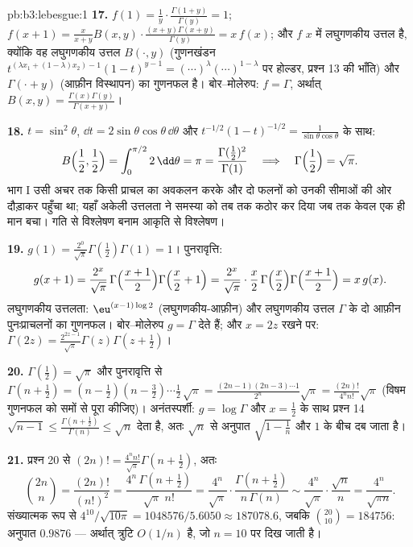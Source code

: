 \begin{solution}{pb:b3:lebesgue:1}
\textbf{17.} $f(1) = \frac1y\cdot\frac{\Gamma(1+y)}{\Gamma(y)}
= 1$; $f(x+1) = \frac{x}{x+y}B(x,y)\cdot\frac{(x+y)\Gamma(x+y)}
{\Gamma(y)} = x\,f(x)$; और $f$ $x$ में लघुगणकीय उत्तल है,
क्योंकि वह लघुगणकीय उत्तल $B(\cdot, y)$ (गुणनखंडन $t^{(\lambda x_1 + (1-\lambda)x_2)-1}(1-t)^{y-1}
= (\cdots)^\lambda(\cdots)^{1-\lambda}$ पर होल्डर, प्रश्न
13 की भाँति) और $\Gamma(\cdot + y)$ (आफ़ीन विस्थापन) का गुणनफल है। बोर--मोलेरुप:
$f =
\Gamma$, अर्थात् $B(x, y) =
\frac{\Gamma(x)\Gamma(y)}{\Gamma(x+y)}$।

\textbf{18.} $t = \sin^2\theta$, $\dd t =
2\sin\theta\cos\theta\,\dd\theta$ और $t^{-1/2}(1-t)^{-1/2} =
\frac1{\sin\theta\cos\theta}$ के साथ:
\[
B\Bigl(\frac12, \frac12\Bigr) =
\int_0^{\pi/2}2\,\dd\theta = \pi
= \frac{\Gamma(\frac12)^2}{\Gamma(1)}
\quad\Longrightarrow\quad
\Gamma\Bigl(\frac12\Bigr) = \sqrt\pi .
\]
भाग I उसी अचर तक किसी प्राचल का अवकलन करके और दो फलनों को उनकी
सीमाओं की ओर दौड़ाकर पहुँचा था; यहाँ अकेली उत्तलता ने समस्या को तब
तक कठोर कर दिया जब तक केवल एक ही मान बचा। गति से विश्लेषण बनाम आकृति
से विश्लेषण।

\textbf{19.} $g(1) = \frac{2^0}{\sqrt\pi}\Gamma(\frac12)
\Gamma(1) = 1$। पुनरावृत्ति:
\[
g(x+1) = \frac{2^{x}}{\sqrt\pi}\,
\Gamma\Bigl(\frac{x+1}2\Bigr)\Gamma\Bigl(\frac x2 + 1\Bigr)
= \frac{2^{x}}{\sqrt\pi}\cdot\frac x2\,
\Gamma\Bigl(\frac x2\Bigr)\Gamma\Bigl(\frac{x+1}2\Bigr)
= x\,g(x) .
\]
लघुगणकीय उत्तलता: $\eu^{(x-1)\log2}$ (लघुगणकीय-आफ़ीन) और लघुगणकीय उत्तल $\Gamma$ के
दो आफ़ीन पुनःप्राचलनों का गुणनफल। बोर--मोलेरुप $g = \Gamma$ देते हैं; और
$x = 2z$ रखने पर: $\Gamma(2z) = \frac{2^{2z-1}}{\sqrt\pi}\Gamma(z)\Gamma(z +
\frac12)$।

\textbf{20.} $\Gamma(\frac12) = \sqrt\pi$ और पुनरावृत्ति से $\Gamma(n + \frac12) = (n - \frac12)(n -
\frac32)\cdots\frac12\,\sqrt\pi =
\frac{(2n-1)(2n-3)\cdots1}{2^n}\sqrt\pi =
\frac{(2n)!}{4^nn!}\sqrt\pi$ (विषम गुणनफल को समों से
पूरा कीजिए)। अनंतस्पर्शी: $g = \log\Gamma$ और $x = \frac12$ के साथ प्रश्न 14 $\sqrt{n-1} \leq
\frac{\Gamma(n+\frac12)}{\Gamma(n)} \leq \sqrt n$ देता
है, अतः $\sqrt n$ से अनुपात $\sqrt{1 - \frac1n}$ और $1$ के बीच दब जाता है।

\textbf{21.} प्रश्न 20 से $(2n)! =
\frac{4^nn!}{\sqrt\pi}\Gamma(n + \tfrac12)$, अतः
\[
\binom{2n}n = \frac{(2n)!}{(n!)^2}
= \frac{4^n\,\Gamma(n+\frac12)}{\sqrt\pi\;n!}
= \frac{4^n}{\sqrt\pi}\cdot
\frac{\Gamma(n+\frac12)}{n\,\Gamma(n)}
\sim \frac{4^n}{\sqrt\pi}\cdot\frac{\sqrt n}{n}
= \frac{4^n}{\sqrt{\pi n}} .
\]
संख्यात्मक रूप से $4^{10}/\sqrt{10\pi} = 1048576/5.6050 \approx
187078.6$, जबकि $\binom{20}{10} = 184756$: अनुपात $0.9876$ --- अर्थात् त्रुटि
$O(1/n)$ है, जो $n = 10$ पर दिख जाती है।


\end{solution}
